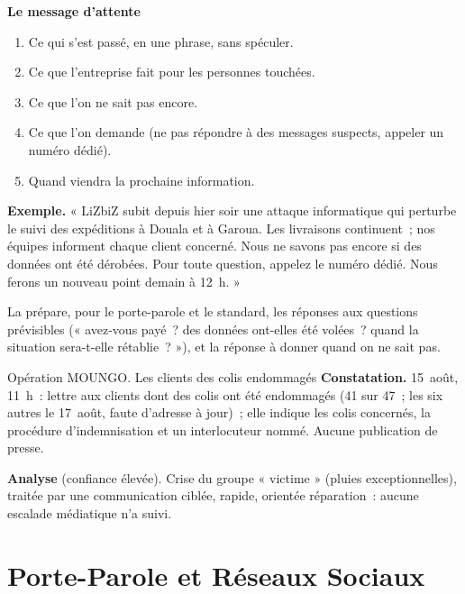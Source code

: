 \begin{boxprocedure}
\textbf{Le message d'attente}
\begin{enumerate}
    \item Ce qui s'est passé, en une phrase, sans spéculer.
    \item Ce que l'entreprise fait pour les personnes touchées.
    \item Ce que l'on ne sait pas encore.
    \item Ce que l'on demande (ne pas répondre à des messages suspects,
          appeler un numéro dédié).
    \item Quand viendra la prochaine information.
\end{enumerate}
\end{boxprocedure}

\textbf{Exemple.} « LiZbiZ subit depuis hier soir une attaque informatique
qui perturbe le suivi des expéditions à Douala et à Garoua. Les livraisons
continuent~; nos équipes informent chaque client concerné. Nous ne savons
pas encore si des données ont été dérobées. Pour toute question, appelez
le numéro dédié. Nous ferons un nouveau point demain à 12~h. »

La  prépare, pour le porte-parole
et le standard, les réponses aux questions prévisibles (« avez-vous payé~?
des données ont-elles été volées~? quand la situation sera-t-elle
rétablie~? »), et la réponse à donner quand on ne sait pas.

\begin{boxscenario}{Opération MOUNGO. Les clients des colis endommagés}
\textbf{Constatation.} 15~août, 11~h~: lettre aux clients dont des colis
ont été endommagés (41 sur 47~; les six autres le 17~août, faute d'adresse
à jour)~; elle indique les colis concernés, la procédure d'indemnisation
et un interlocuteur nommé. Aucune publication de presse.

\medskip
\textbf{Analyse} (confiance élevée). Crise du groupe « victime » (pluies
exceptionnelles), traitée par une communication ciblée, rapide, orientée
réparation~: aucune escalade médiatique n'a suivi.
\end{boxscenario}

\section{Porte-Parole et Réseaux Sociaux}
\label{sec:c24-canaux}

